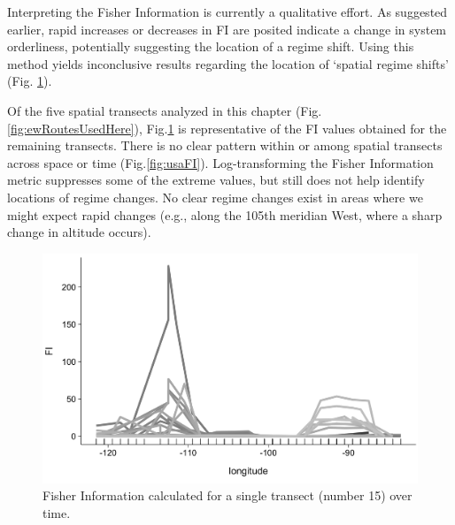 \documentclass[12pt,twoside,openany]{reedthesis}
\begin{document}
Interpreting the Fisher Information is currently a qualitative effort.
As suggested earlier, rapid increases or decreases in FI are posited
indicate a change in system orderliness, potentially suggesting the
location of a regime shift. Using this method yields inconclusive
results regarding the location of `spatial regime shifts' (Fig.
\ref{fig:fi1Tsect}).

Of the five spatial transects analyzed in this chapter (Fig.
\ref{fig:ewRoutesUsedHere}), Fig.\ref{fig:fi1Tsect} is representative of
the FI values obtained for the remaining transects. There is no clear
pattern within or among spatial transects across space or time
(Fig.\ref{fig:usaFI}). Log-transforming the Fisher Information metric
suppresses some of the extreme values, but still does not help identify
locations of regime changes. No clear regime changes exist in areas
where we might expect rapid changes (e.g., along the 105th meridian
West, where a sharp change in altitude occurs).
\begin{figure}
\includegraphics[width=0.95\linewidth]{./chapterFiles/fisherSpatial/figures/figsCalledInDiss/transect_15_East-West_metric_FI_Eqn712} \caption{Fisher Information calculated for a single transect (number 15) over time.}\label{fig:fi1Tsect}
\end{figure}
\end{document}
